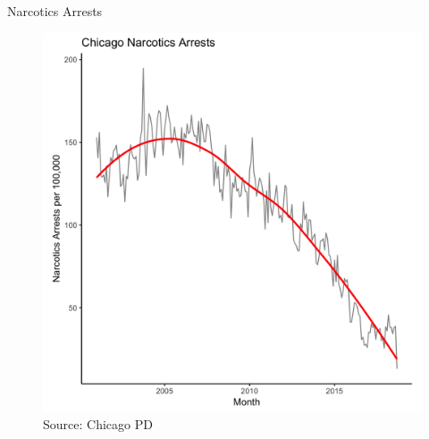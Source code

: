 \documentclass[10pt,ignorenonframetext,]{beamer}
\begin{document}
\begin{frame}{Narcotics Arrests}
\protect\hypertarget{narcotics-arrests}{}

\begin{figure}
\centering
\includegraphics{../chicago/figs/narcotics_t_plot.png}
\caption{Source: Chicago PD}
\end{figure}

\end{frame}
\end{document}
